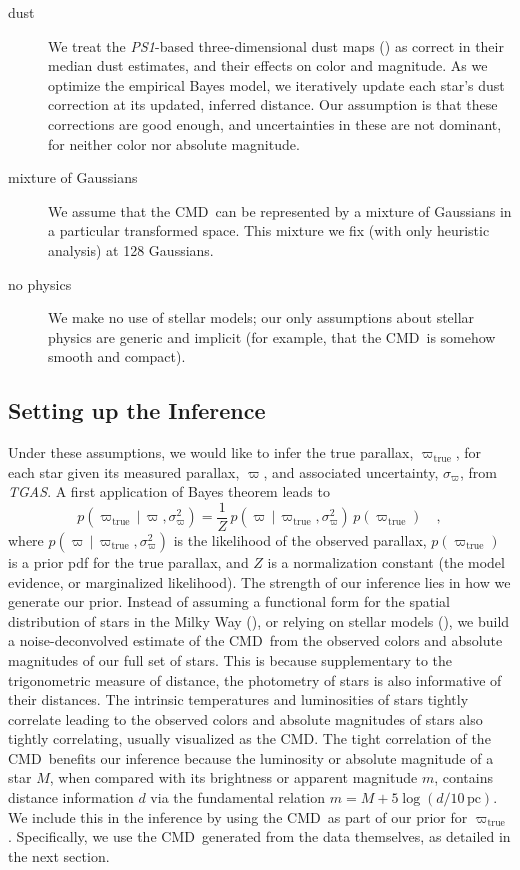 \documentclass[modern]{aastex61}
\newcommand{\acronym}[1]{{\small{#1}}}
\newcommand{\project}[1]{\textsl{#1}}
\newcommand{\tgas}{\project{\acronym{TGAS}}}
\newcommand{\psone}{\project{\acronym{PS1}}}
\newcommand{\cmd}{\acronym{CMD}}
\newcommand{\given}{\,|\,}
\newcommand{\true}{\mathrm{true}}
\begin{document}
\begin{description}
\item[dust] We treat the \psone-based three-dimensional dust maps (\citealt{green15})
  as correct in their median dust estimates, and their
  effects on color and magnitude. As we optimize the empirical Bayes model, we iteratively update each star's
  dust correction at its updated, inferred distance. Our assumption is that these corrections are
  good enough, and uncertainties in these are not dominant, for neither
  color nor absolute magnitude.
\item[mixture of Gaussians] We assume that the \cmd\ can be represented by a mixture of
  Gaussians in a particular transformed space. This mixture we fix
  (with only heuristic analysis) at 128 Gaussians.
\item[no physics] We make no use of stellar models; our only assumptions about
  stellar physics are generic and implicit (for example, that the
  \cmd\ is somehow smooth and compact).
\end{description}

\subsection{Setting up the Inference}

Under these assumptions, we would like to infer the true parallax, $\varpi_{\true}$, for each star given its measured parallax, $\varpi$, and associated uncertainty, $\sigma_{\varpi}$, from \tgas.
A first application of Bayes theorem leads to
\begin{equation}
p(\varpi_{\true} \given \varpi, \sigma^2_{\varpi}) = \frac{1}{Z}\,p(\varpi \given \varpi_{\true}, \sigma^2_{\varpi}) \, p(\varpi_{\true}) \quad ,
\label{eq:bayes}
\end{equation}
where $p(\varpi \given \varpi_{\true}, \sigma^2_{\varpi})$ is the likelihood of the observed parallax, $p(\varpi_{\true})$ is a prior pdf for the true
parallax, and $Z$ is a normalization constant (the model evidence, or marginalized likelihood).
The strength of our inference lies in how we generate our prior.
Instead of assuming a functional form for the spatial distribution of stars in the Milky Way (\citealt{astraatmadja16b}), or relying on stellar models (\citealt{gaia16}), we build a noise-deconvolved estimate of the \cmd\ from the observed colors and absolute magnitudes of our full set of stars.
This is because supplementary to the trigonometric measure of distance, the photometry of stars is also informative of their distances.
The intrinsic temperatures and luminosities of stars tightly correlate leading to the observed colors and absolute magnitudes of stars also tightly correlating, usually visualized as the \cmd.
The tight correlation of the \cmd\ benefits our inference because the luminosity or absolute magnitude of a star $M$, when compared with its brightness or apparent magnitude $m$, contains distance information $d$ via the fundamental relation $m=M+5\log(d/10\, \mathrm{pc})$.
We include this in the inference by using the \cmd\ as part of our prior for $\varpi_{\true}$.
Specifically, we use the \cmd\ generated from the data themselves, as detailed in the next section.
\end{document}
